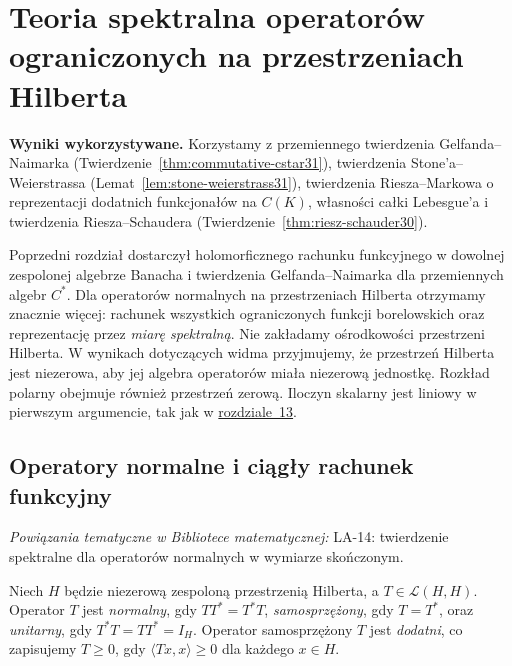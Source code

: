 \setcounter{section}{31}
\section{Teoria spektralna operatorów ograniczonych na przestrzeniach Hilberta}
\label{sec:spectral-hilbert32}

\providecommand{\atlasref}[2]{#2}

\noindent\textbf{Wyniki wykorzystywane.}
Korzystamy z przemiennego twierdzenia Gelfanda--Naimarka
(Twierdzenie~\ref{thm:commutative-cstar31}), twierdzenia
Stone'a--Weierstrassa (Lemat~\ref{lem:stone-weierstrass31}),
twierdzenia Riesza--Markowa o reprezentacji dodatnich
funkcjonałów na $C(K)$, własności całki Lebesgue'a
i twierdzenia Riesza--Schaudera (Twierdzenie~\ref{thm:riesz-schauder30}).
\par\medskip

Poprzedni rozdział dostarczył holomorficznego rachunku funkcyjnego
w dowolnej zespolonej algebrze Banacha i twierdzenia Gelfanda--Naimarka
dla przemiennych algebr $C^*$. Dla operatorów normalnych na przestrzeniach
Hilberta otrzymamy znacznie więcej: rachunek wszystkich ograniczonych
funkcji borelowskich oraz reprezentację przez \emph{miarę spektralną}.
Nie zakładamy ośrodkowości przestrzeni Hilberta. W wynikach dotyczących
widma przyjmujemy, że przestrzeń Hilberta jest niezerowa, aby jej algebra
operatorów miała niezerową jednostkę. Rozkład polarny obejmuje również
przestrzeń zerową. Iloczyn skalarny jest
liniowy w pierwszym argumencie, tak jak w \hyperref[sec:hilbert13]{rozdziale~13}.

\subsection{Operatory normalne i ciągły rachunek funkcyjny}

\noindent\emph{Powiązania tematyczne w Bibliotece matematycznej:} \atlasref{LA-14::thm:lin14-normal-spectral}{LA-14: twierdzenie spektralne dla operatorów normalnych w wymiarze skończonym}.


\begin{definicja}
\label{def:normal32}
Niech $H$ będzie niezerową zespoloną przestrzenią Hilberta,
a $T\in\mathcal L(H,H)$. Operator $T$ jest \emph{normalny}, gdy
$TT^*=T^*T$, \emph{samosprzężony}, gdy $T=T^*$, oraz
\emph{unitarny}, gdy $T^*T=TT^*=I_H$. Operator samosprzężony
$T$ jest \emph{dodatni}, co zapisujemy $T\geq0$, gdy
$\langle Tx,x\rangle\geq0$ dla każdego $x\in H$.
\end{definicja}

